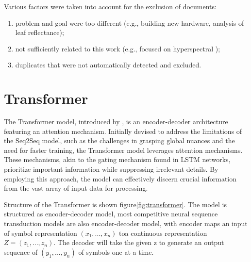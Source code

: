 Various factors were taken into account for the exclusion of documents:
\begin{enumerate}
    \item problem and goal were too different (e.g., building new hardware, analysis of leaf reflectance);
    \item not sufficiently related to this work (e.g., focused on hyperspectral );
    \item duplicates that were not automatically detected and excluded.
\end{enumerate}


\section{Transformer}


The Transformer model, introduced by \cite{vaswani2023attention}, is an encoder-decoder architecture featuring an attention mechanism. Initially devised to address the limitations of the Seq2Seq model, such as the challenges in grasping global nuances and the need for faster training, the Transformer model leverages attention mechanisms. These mechanisms, akin to the gating mechanism found in LSTM networks, prioritize important information while suppressing irrelevant details. By employing this approach, the model can effectively discern crucial information from the vast array of input data for processing.

Structure of the Transformer is shown figure\ref{fig:transformer}. The model is structured as encoder-decoder model, most competitive neural sequence transduction models are also encoder-decoder model, with encoder maps an input of symbol representation $(x_1, ...,x_n)$ toa continuous representation $Z=(z_1,...,z_n)$. The decoder will take the given z to generate an output sequence of $(y_1,...,y_n)$ of symbols one at a time.

